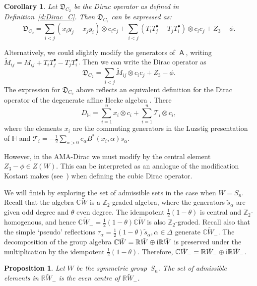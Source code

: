 \documentclass[pdftex]{sigma}
\numberwithin{equation}{section}
\newtheorem{Corollary}[Theorem]{Corollary}
\newtheorem{Proposition}[Theorem]{Proposition}
 { \theoremstyle{definition}
\newtheorem{Definition}[Theorem]{Definition}
\newtheorem{Note}[Theorem]{Note}
\newtheorem{Example}[Theorem]{Example}
\newtheorem{Remark}[Theorem]{Remark} }
\newcommand{\bbc}{\mathbb{C}}
\newcommand{\bbr}{\mathbb{R}}
\newcommand{\bbz}{\mathbb{Z}}
\DeclareMathOperator{\ama}{\mathsf{A}}
\begin{document}
\begin{Corollary}
Let $\mathfrak{D}_{C_2}$ be the Dirac operator as defined in Definition~{\rm \ref{d:Dirac_C}}. Then $\mathfrak{D}_{C_2}$ can be expressed as:
\[\mathfrak{D}_{C_2} = \sum_{i <j} (x_iy_j - x_jy_i) \otimes c_ic_j +\sum_{i<j}( T_iT_j^\bullet - T_jT_i^\bullet) \otimes c_ic_j + Z_3 - \phi.\]
\end{Corollary}

\begin{Remark}
Alternatively, we could slightly modify the generators of $\ama$, writing $\tilde{M}_{ij} = M_{ij} + T_iT_j^\bullet - T_jT_i^\bullet$. Then we can write the Dirac operator as
\[\mathfrak{D}_{C_2} = \sum_{i <j} \tilde{M}_{ij} \otimes c_ic_j + Z_3 - \phi.\]
The expression for $\mathfrak{D}_{C_2}$ above reflects an equivalent definition for the Dirac operator of the degenerate affine Hecke algebra \cite{BCT12}. There
\[D_\mathbb{H} = \sum_{i=1}^n x_i \otimes c_i + \sum_{i=1}^n \mathcal{T}_i \otimes c_i,
\]
where the elements $x_i$ are the commuting generators in the Luzstig presentation of $\mathbb{H}$ and $\mathcal{T}_i =-\frac{1}{2} \sum_{\alpha >0} c_\alpha B^*(x_i,\alpha)s_\alpha$.

However, in the AMA-Dirac we must modify by the central element $Z_3 - \phi \in Z(W)$. This can be interpreted as an analogue of the modification Kostant makes (see~\cite{K03}) when defining the cubic Dirac operator.
\end{Remark}

We will finish by exploring the set of admissible sets in the case when $W=S_n$. Recall that the algebra $\bbc \tilde{W}$ is a $\bbz_2$-graded algebra, where the generators $\tilde{s}_\alpha$ are given odd degree and $\theta$ even degree. The idempotent $\frac{1}{2} (1-\theta)$ is central and $\bbz_2$-homogenous, and hence $\bbc \tilde{W}_- =\frac{1}{2}(1-\theta)\bbc \tilde{W}$ is also $\bbz_2$-graded. Recall also that the simple `pseudo' reflections $\tau_\alpha = \frac{1}{2} (1 - \theta) \tilde{s}_\alpha, \alpha \in \Delta$ generate $\mathbb{C}\tilde{W}_-$.
The decomposition of the group algebra $\bbc \tilde{W} = \bbr \tilde{W} \oplus {\rm i} \bbr \tilde{W}$ is preserved under the multiplication by the idempotent $\frac{1}{2} (1 - \theta)$. Therefore, $\bbc \tilde{W}_- = \bbr \tilde{W}_- \oplus {\rm i} \bbr \tilde{W}_-$.

\begin{Proposition}\label{p::admissible} Let $W$ be the symmetric group~$S_n$. The set of admissible elements in $\mathbb{R}\tilde{W}_-$ is the even centre of $\mathbb{R}\tilde{W}_-$. \end{Proposition}
\end{document}
